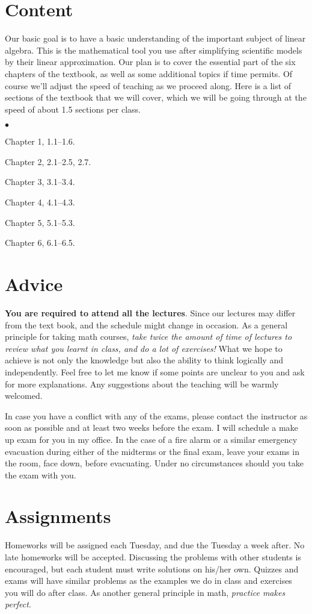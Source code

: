 \documentclass[margin,line]{res}
\newenvironment{list2}{
  \begin{list}{$\bullet$}{%
      \setlength{\itemsep}{0in}
      \setlength{\parsep}{0in} \setlength{\parskip}{0in}
      \setlength{\topsep}{0in} \setlength{\partopsep}{0in}
      \setlength{\leftmargin}{0.2in}}}{\end{list}}
\begin{document}
\begin{resume}
\section{\sc Content}
Our basic goal is to have a basic understanding of the important subject of linear algebra. This is the mathematical tool you use after simplifying scientific models by their linear approximation. Our plan is to cover the essential part of the six chapters of the textbook, as well as some additional topics if time permits. Of course we'll adjust the speed of teaching as we proceed along. Here is a list of sections of the textbook that we will cover, which we will be going through at the speed of about 1.5 sections per class.
\begin{list2}
\item Chapter 1, 1.1--1.6.
\item Chapter 2, 2.1--2.5, 2.7.
\item Chapter 3, 3.1--3.4.
\item Chapter 4, 4.1--4.3.
\item Chapter 5, 5.1--5.3.
\item Chapter 6, 6.1--6.5.
\end{list2}

\section{\sc Advice}
{\bf You are required to attend all the lectures}. Since our
lectures may differ from the text book, and the
schedule might change in occasion. As a general principle for
taking math courses, \emph{take twice the amount of time of lectures
to review what you learnt in class, and do a lot of exercises!} What
we hope to achieve is not only the knowledge but also the ability
to think logically and independently. Feel free to let me know if
some points are unclear to you and ask for more explanations. Any
suggestions about the teaching will be warmly welcomed.

In case you have a conflict with any of the exams, please contact the
instructor as soon as possible and at least two weeks before the
exam. I will schedule a make up exam for you in my office. In the case of a fire alarm or a similar emergency evacuation during either of the midterms or the final exam, leave your exams in the room, face down, before evacuating. Under no circumstances should you take the exam with you.


\section{\sc Assignments}
Homeworks will be assigned each Tuesday, and due the Tuesday a week after. No late homeworks will be accepted. Discussing the problems with other students is encouraged, but each student must write solutions on his/her own. Quizzes and exams will have similar problems as the examples we
do in class and exercises you will do after class. As another general principle in math,
\emph{practice makes perfect}.


\end{resume}
\end{document}
